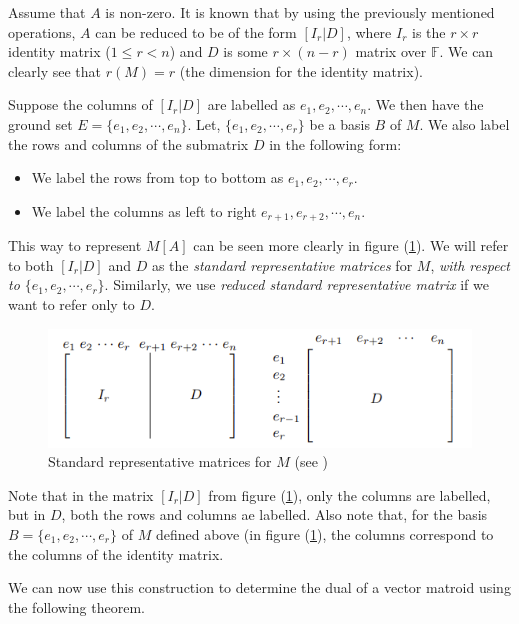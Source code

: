 Assume that $A$ is non-zero. It is known that by using the previously mentioned operations, $A$ can be reduced to be of the form $[I_r|D]$, where $I_r$ is the $r \times r$ identity matrix ($1\leq r< n$) and $D$ is some $r \times (n-r)$ matrix over $\mathbb{F}$. We can clearly see that $r(M)=r$ (the dimension for the identity matrix). 

Suppose the columns of $[I_r|D]$ are labelled as $e_1, e_2,\cdots,e_n$. We then have the ground set $E=\{e_1, e_2,\cdots,e_n\}$. Let, $\{e_1, e_2,\cdots,e_r\}$ be a basis $B$ of $M$. We also label the rows and columns of the submatrix $D$ in the following form:
\begin{itemize}
  \item We label the rows from top to bottom as $e_1, e_2,\cdots,e_r$.
  \item We label the columns as left to right $e_{r+1}, e_{r+2},\cdots,e_n$.
\end{itemize}

  This way to represent $M[A]$ can be seen more clearly in figure (\ref{StandertRepMat}). We will refer to both $[I_r|D]$ and $D$ as the \textit{standard representative matrices} for $M$, \textit{with respect to $\{e_1, e_2,\cdots,e_r\}$}. Similarly, we use \textit{reduced standard representative matrix} if we want to refer only to $D$.

\begin{figure}[H]
    \centering
    \includegraphics{SRF.png}
    \caption{Standard representative matrices for $M$ (see \cite{oxley1})}
    \label{StandertRepMat}
\end{figure}

Note that in the matrix $[I_r|D]$ from figure (\ref{StandertRepMat}),  only the columns are labelled, but in $D$, both the rows and columns ae labelled. Also note that, for the basis $B=\{e_1, e_2,\cdots,e_r\}$ of $M$ defined above (in figure (\ref{StandertRepMat}), the columns correspond to the columns of the identity matrix.

We can now use this construction to determine the dual of a vector matroid using the following theorem.

